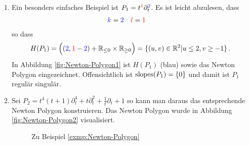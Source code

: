 \begin{exmp}
\label{exmp:Newton-Polygon}
\begin{enumerate}
\item Ein besonders einfaches Beispiel ist 
$P_1=t^{\textcolor{red}1}\partial_t^{\textcolor{blue}2}$.  Es ist leicht
abzulesen, dass
\begin{align*}
\textcolor{blue}k &= \textcolor{blue}2 & 
\textcolor{red}l  &= \textcolor{red}1
\end{align*}
so dass
\[
H(P_1)=\Big( (\textcolor{blue}{2},\textcolor{red}{1}-\textcolor{blue}{2}) +
\mathbb{R}_{\leq 0}\times \mathbb{R}_{\geq 0} \Big) =\{(u,v)\in\mathbb{R}^2|u\leq 2, v\geq -1\} \,.
\]
In Abbildung \ref{fig:Newton-Polygon1} ist $H(P_1)$ (blau) sowie das Newton
Polygon eingezeichnet. Offensichtlich ist $\operatorname{slopes}(P_1)=\{0\}$ und damit ist
$P_1$ regulär singulär.
\item \cite[Bsp 5.3. 2.]{ZulaBarbara}
Sei $P_2=t^4(t+1)\partial_t^4+t\partial_t^2+\frac{1}{t}\partial_t+1$ so kann
man daraus das entsprechende Newton Polygon konstruieren.
Das Newton Polygon wurde in Abbildung \ref{fig:Newton-Polygon2} visualisiert.
%
\begin{figure}[h]
\label{fig:Newton-Polygon}
\caption{Zu Beispiel \ref{exmp:Newton-Polygon}}
\begin{center}
\quad
{}
\end{center}
\end{figure}
%
\end{enumerate}
\end{exmp}

\begin{comment}
\begin{lem}
\cite[5.1]{sabbah_cimpa90} %
\begin{enumerate}
\item $\cP(\cM_K)$ ist nicht Leer, wenn $\cM_K\neq\{0\}$
\item Wenn mann eine exacte Sequenz
$0\rightarrow{\cM'}_K\rightarrow{\cM}_K\rightarrow{\cM''}_K\rightarrow0$
hat, so gilt $\cP(\cM_K)=\cP({\cM'}_K)\cup\cP({\cM''}_K)$.
\end{enumerate}
\end{lem}
\end{comment}

